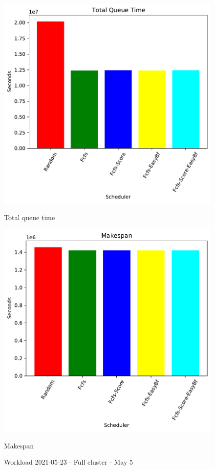\documentclass[a4paper]{article}
\begin{document}
\begin{figure}[H]
	\begin{minipage}[b]{0.5\linewidth}\centering\includegraphics[width=1.11\linewidth]{MBSS/plot/2021-05-23_Total_queue_time.pdf}\caption{Total queue time}\vspace{4ex}\end{minipage}
	\begin{minipage}[b]{0.5\linewidth}\centering\includegraphics[width=1.11\linewidth]{MBSS/plot/2021-05-23_Makespan.pdf}\caption{Makespan}\vspace{4ex}\end{minipage}\caption{Workload 2021-05-23 - Full cluster - May 5}\end{figure}
\end{document}
